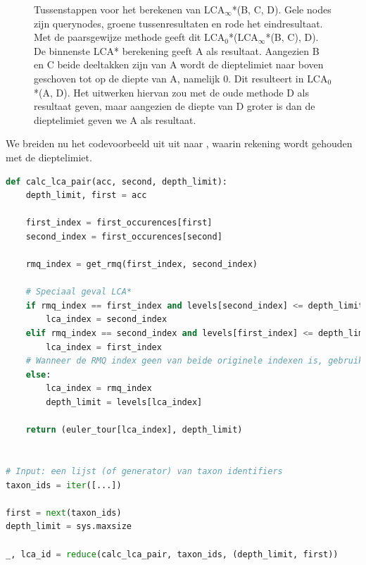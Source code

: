 \begin{figure}
\begin{subfigure}{0.33\linewidth}
        \caption{}
        \label{tikz:lcafix*bcd3}
    \end{subfigure}
    \caption{Tussenstappen voor het berekenen van $\text{LCA}_\infty$*(B, C, D).
    Gele nodes zijn querynodes, groene tussenresultaten en rode het
    eindresultaat. Met de paarsgewijze methode geeft dit 
    $\text{LCA}_0$*($\text{LCA}_\infty$*(B, C), D). De binnenste LCA* 
    berekening geeft A als resultaat. Aangezien B en C beide 
    deeltakken zijn van A wordt de dieptelimiet naar boven geschoven tot op de 
    diepte van A, namelijk 0. Dit resulteert in $\text{LCA}_0$*(A, D). Het 
    uitwerken hiervan zou met de oude methode D als resultaat geven, maar 
    aangezien de diepte van D groter is dan de dieptelimiet geven we A als 
    resultaat.}
    \label{tikz:lcafix*bcd}
\end{figure}

We breiden nu het codevoorbeeld uit  uit naar 
, waarin rekening wordt gehouden met de dieptelimiet.

\begin{lstlisting}[language=Python, caption={Uitbreinding van de voorbeeldcode 
uit \Vref{lst:lca*example} in Python voor de LCA* berekening van 2 nodes. Deze 
code houdt rekening met de toegevoegde \texttt{depth\_limit} parameter. Zoals 
besproken kan de \texttt{reduce} stap hier ook geparallelliseerd worden in 
plaats van met een accumulator te werken.}, 
label={lst:lcafix*example}]
def calc_lca_pair(acc, second, depth_limit):
    depth_limit, first = acc

    first_index = first_occurences[first]
    second_index = first_occurences[second]
    
    rmq_index = get_rmq(first_index, second_index)
    
    # Speciaal geval LCA*
    if rmq_index == first_index and levels[second_index] <= depth_limit:
        lca_index = second_index
    elif rmq_index == second_index and levels[first_index] <= depth_limit:
        lca_index = first_index
    # Wanneer de RMQ index geen van beide originele indexen is, gebruik LCA
    else:
        lca_index = rmq_index
        depth_limit = levels[lca_index]
    
    return (euler_tour[lca_index], depth_limit)
    

# Input: een lijst (of generator) van taxon identifiers
taxon_ids = iter([...])

first = next(taxon_ids)
depth_limit = sys.maxsize

_, lca_id = reduce(calc_lca_pair, taxon_ids, (depth_limit, first))

\end{lstlisting}

